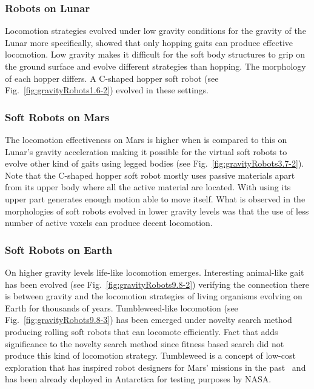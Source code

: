 \documentclass{sig-alternate}
\begin{document}
\subsubsection*{Robots on Lunar}

Locomotion strategies evolved under low gravity conditions for the gravity of the Lunar more specifically, showed that only hopping gaits can produce effective locomotion. Low gravity makes it difficult for the soft body structures to grip on the ground surface and evolve different strategies than hopping. The morphology of each hopper differs. A C-shaped hopper soft robot (see Fig.~\ref{fig:gravityRobots1.6-2}) evolved in these settings.

\subsubsection*{Soft Robots on Mars}

The locomotion effectiveness on Mars is higher when is compared to this on Lunar's gravity acceleration making it possible for the virtual soft robots to evolve other kind of gaits using legged bodies (see Fig.~\ref{fig:gravityRobots3.7-2}). Note that the C-shaped hopper soft robot mostly uses passive materials apart from its upper body where all the active material are located. With using its upper part generates enough motion able to move itself. What is observed in the morphologies of soft robots evolved in lower gravity levels was that the use of less number of active voxels can produce decent locomotion.

\subsubsection*{Soft Robots on Earth}

On higher gravity levels life-like locomotion emerges. Interesting animal-like gait has been evolved (see Fig.~\ref{fig:gravityRobots9.8-2}) verifying the connection there is between gravity and the locomotion strategies of living organisms evolving on Earth for thousands of years. Tumbleweed-like locomotion (see Fig.~\ref{fig:gravityRobots9.8-3}) has been emerged under novelty search method producing rolling soft robots that can locomote efficiently. Fact that adds significance to the novelty search method since fitness based search did not produce this kind of locomotion strategy. Tumbleweed is a concept of low-cost exploration that has inspired robot designers for Mars' missions in the past~\cite{antol2003low} and has been already deployed in Antarctica for testing purposes by NASA.
\end{document}
